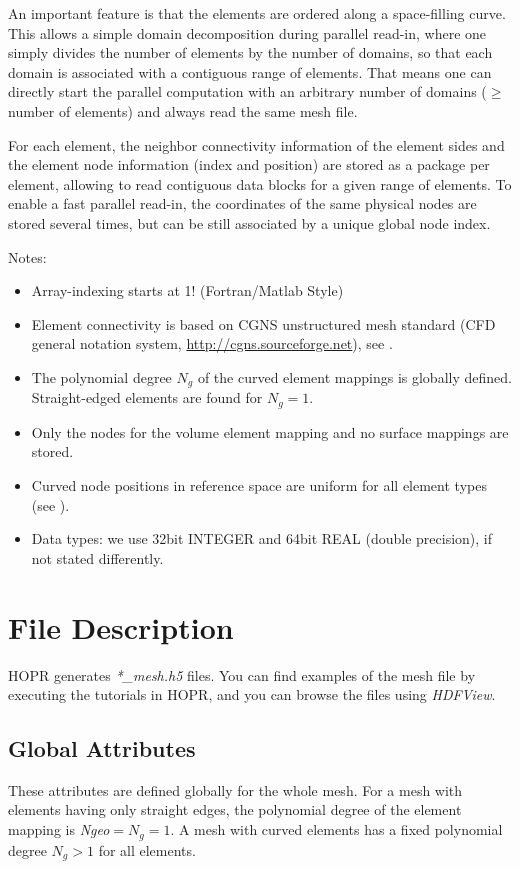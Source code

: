 \documentclass[a4paper,headsepline]{scrreprt}
\newcommand\rf[1]{\prettyref{#1}}
\newcommand\Ngeo{N_g}
\begin{document}
An important feature is that the elements are ordered along a space-filling curve. This allows a simple domain decomposition during parallel read-in, where one simply divides the number of elements by the number of domains, so that each domain is associated with a contiguous range of elements. That means one can directly start the parallel computation with an arbitrary number of domains ($\geq$ number of elements) and always read the same  mesh file. 

For each element,  the neighbor connectivity information of the element sides and the element node information (index and position) are stored as a package per element, allowing to read contiguous data blocks for a given range of elements. To enable a fast parallel read-in, the coordinates of the same physical nodes are stored several times, but can be still associated by a unique global node index. 

Notes:\\
\begin{itemize}
 \item  Array-indexing starts at 1! (Fortran/Matlab Style)
 \item  Element connectivity is based on CGNS unstructured mesh standard (CFD general notation system, \url{http://cgns.sourceforge.net}), see \rf{sec:CGNS}.
 \item  The polynomial degree $\Ngeo$ of the curved element mappings is globally defined. Straight-edged elements are found for $\Ngeo=1$.
 \item  Only the nodes for the volume element mapping and no surface mappings are stored.
 \item  Curved node positions in reference space are uniform for all element types (see \rf{sec:elemnodes}).
 \item  Data types: we use 32bit INTEGER and 64bit REAL (double precision), if not stated differently.
\end{itemize}



\chapter{File Description}
HOPR generates \emph{*\_mesh.h5} files. You can find examples of the mesh file by executing the tutorials in HOPR, and you can browse the files using \emph{HDFView}.

\section{Global Attributes}
\label{sec:globals}
These attributes are defined globally for the whole mesh. For a mesh with elements having only straight edges, the polynomial degree of the element mapping is \textit{Ngeo}$=\Ngeo=1$.  A mesh with curved elements has a fixed polynomial degree $\Ngeo>1$ for all elements. 
\end{document}
